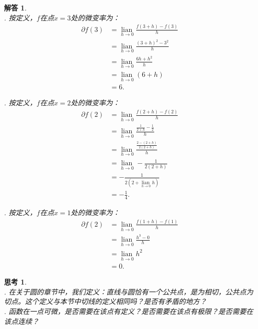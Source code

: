 \documentclass[12pt,UTF8]{ctexbook}
\newcommand{\lian}[1]{
    \underset{#1}{\operatorname{lian}\,}
}
\newtheorem{sk}{思考}[section]
\newtheorem*{so}{解答}
\begin{document}
\begin{so}
    \mbox{} \\
    . 按定义，$f$在点$x = 3$处的微变率为：
    \begin{align*}
        \partial f(3) &= \lian{h\to 0}\frac{f(3 + h) - f(3)}{h}  \\
        &= \lian{h\to 0}\frac{(3 + h)^2 - 3^2}{h}  \\
        &= \lian{h\to 0}\frac{6h + h^2}{h}  \\
        &= \lian{h\to 0}(6 + h)  \\
        &= 6.  
    \end{align*}

    . 按定义，$f$在点$x = 2$处的微变率为：
    \begin{align*}
        \partial f(2) &= \lian{h\to 0}\frac{f(2 + h) - f(2)}{h}  \\
        &= \lian{h\to 0}\frac{\frac{1}{2+h} - \frac{1}{2}}{h}  \\
        &= \lian{h\to 0}\frac{\frac{2 - (2 + h)}{2(2 + h)}}{h}  \\
        &= \lian{h\to 0}-\frac{1}{2(2 + h)}  \\
        &= -\frac{1}{2(2 + \lian{h\to 0}h)}  \\
        &= -\frac{1}{4}. 
    \end{align*}

    . 按定义，$f$在点$x = 1$处的微变率为：
    \begin{align*}
        \partial f(2) &= \lian{h\to 0}\frac{f(1 + h) - f(1)}{h}  \\
        &= \lian{h\to 0}\frac{h^3 - 0}{h}  \\
        &= \lian{h\to 0}h^2  \\
        &= 0. 
    \end{align*}
\end{so}

\begin{sk}
    \mbox{} \\
    . 在关于圆的章节中，我们定义：直线与圆恰有一个公共点，是为相切，公共点为切点。这个定义与本节中切线的定义相同吗？是否有矛盾的地方？\\
    . 函数在一点可微，是否需要在该点有定义？是否需要在该点有极限？是否需要在该点连续？
\end{sk}
\end{document}
